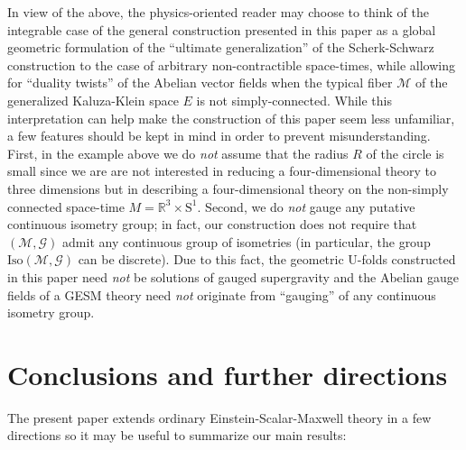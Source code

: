 \documentclass[10pt, cmp, numbook, final, a4paper]{svjour}
\def\R{\mathbb{R}}
\newcommand{\cM}{\mathcal{M}}
\def\cG{\mathcal{G}}
\def\rS{\mathrm{S}}
\def\Iso{\mathrm{Iso}}
\begin{document}
In view of the above, the physics-oriented reader may choose to think
of the integrable case of the general construction presented in this
paper as a global geometric formulation of the ``ultimate
generalization'' of the Scherk-Schwarz construction to the case of
arbitrary non-contractible space-times, while allowing for ``duality
twists'' of the Abelian vector fields when the typical fiber $\cM$ of
the generalized Kaluza-Klein space $E$ is not simply-connected. While
this interpretation can help make the construction of this paper seem
less unfamiliar, a few features should be kept in mind in order to
prevent misunderstanding. First, in the example above we do {\em not}
assume that the radius $R$ of the circle is small since we are are not
interested in reducing a four-dimensional theory to three dimensions
but in describing a four-dimensional theory on the non-simply
connected space-time $M=\R^3\times \rS^1$. Second, we do {\em not}
gauge any putative continuous isometry group; in fact, our
construction does not require that $(\cM,\cG)$ admit any continuous group of
isometries (in particular, the group $\Iso(\cM,\cG)$ can be
discrete). Due to this fact, the geometric U-folds constructed in this
paper need {\em not} be solutions of gauged supergravity and the
Abelian gauge fields of a GESM theory need {\em not} originate from
``gauging'' of any continuous isometry group.

\section{Conclusions and further directions}
\label{sec:conclusions}

The present paper extends ordinary Einstein-Scalar-Maxwell theory 
in a few directions so it may be useful to summarize our main results:
\end{document}
